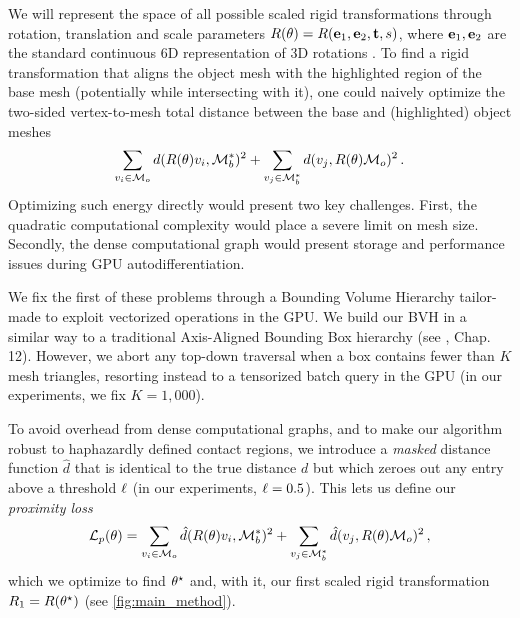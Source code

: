 We will represent the space of all possible scaled rigid transformations through rotation, translation and scale parameters $R(\theta) = R (\mathbf{e}_1, \mathbf{e}_2, \mathbf{t}, s)$, where $\mathbf{e}_1, \mathbf{e}_2$ are the standard continuous 6D representation of 3D rotations \cite{zhou2019continuity}.
To find a rigid transformation that aligns the object mesh with the highlighted region of the base mesh (potentially while intersecting with it), one could naively optimize the two-sided vertex-to-mesh total distance between the base and (highlighted) object meshes
\begin{equation*}
    \sum_{v_{i} \in \mathcal{M}_o} d (R(\theta)v_i, \mathcal{M}_b^*)^2 +  \sum_{v_{j} \in \mathcal{M}_b^*} d(v_j, R (\theta)\mathcal{M}_o)^2\, .
\end{equation*}
Optimizing such energy directly would present two key challenges. First, the quadratic computational complexity would place a severe limit on mesh size. Secondly, the dense computational graph would present storage and performance issues during GPU autodifferentiation.



We fix the first of these problems through a Bounding Volume Hierarchy tailor-made to exploit vectorized operations in the GPU.
We build our BVH in a similar way to a traditional Axis-Aligned Bounding Box hierarchy (see \cite{shirley2009fundamentals}, Chap. 12). However, we abort any top-down traversal when a box contains fewer than $K$ mesh triangles, resorting instead to a tensorized batch query in the GPU (in our experiments, we fix $K=1,000$).

To avoid overhead from dense computational graphs, and to make our algorithm robust to haphazardly defined contact regions, we introduce a \emph{masked} distance function $\hat{d}$ that is identical to the true distance $d$ but which zeroes out any entry above a threshold $\ell$ (in our experiments, $\ell=0.5$). This lets us define our \emph{proximity loss}
\begin{equation*}
    \mathcal{L}_{p}(\theta) = \sum_{v_{i} \in \mathcal{M}_o} \hat{d} (R(\theta)v_i, \mathcal{M}_b^*)^2 +  \sum_{v_{j} \in \mathcal{M}_b^*} \hat{d}(v_j, R (\theta)\mathcal{M}_o)^2\, ,
\end{equation*}
which we optimize to find $\theta^\star$ and, with it, our first scaled rigid transformation $R_1 = R (\theta^\star)$ (see \autoref{fig:main_method}).




